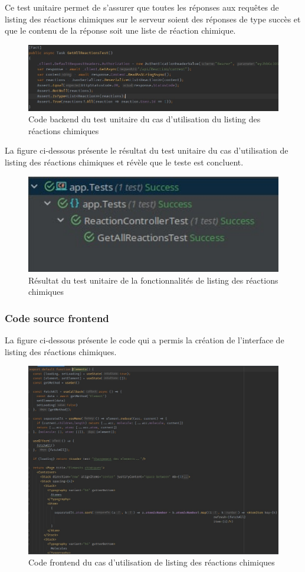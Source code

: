 Ce test unitaire permet de s’assurer que toutes les réponses aux requêtes de listing des réactions chimiques sur le serveur soient des réponses de type succès et que le contenu de la réponse soit une liste de réaction chimique.

\begin{figure}[H]
	\centering
	\includegraphics[width=1\textwidth]{img/utreaall}
	\caption{Code backend du test unitaire du cas d'utilisation du listing des réactions chimiques}
\end{figure}

La figure ci-dessous présente le résultat du test unitaire du cas d'utilisation de listing des réactions chimiques et révèle que le teste est concluent.

\begin{figure}[H]
	\centering
	\includegraphics[width=1\textwidth]{img/utrcr}
	\caption{Résultat du test unitaire de la fonctionnalités de listing des réactions chimiques}
\end{figure}

\subsubsection{Code source frontend}

La figure ci-dessous présente le code qui a permis la création de l'interface de listing des réactions chimiques.

\begin{figure}[H]
	\centering
	\includegraphics[width=1\textwidth]{img/frl}
	\caption{Code frontend du cas d'utilisation de listing des réactions chimiques}
\end{figure}